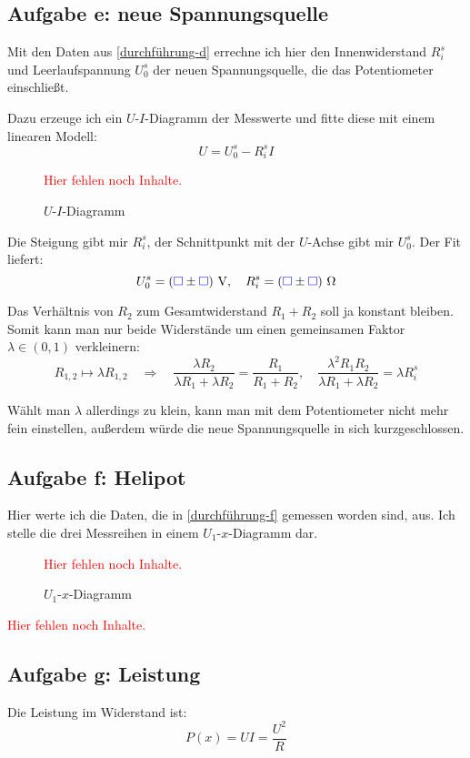 \documentclass[11pt,german]{article}
\newcommand{\messwert}{\textcolor{blue}{\square}}
\newcommand{\emesswert}{\left(\messwert \pm \messwert \right)}
\newcommand{\fehlt}{\textcolor{red}{Hier fehlen noch Inhalte.}}
\begin{document}
\subsection{Aufgabe e: neue Spannungsquelle}

Mit den Daten aus \ref{durchführung-d} errechne ich hier den Innenwiderstand
$R_i^s$ und Leerlaufspannung $U_0^s$ der neuen Spannungsquelle, die das
Potentiometer einschließt.

Dazu erzeuge ich ein $U$-$I$-Diagramm der Messwerte und fitte diese mit einem linearen Modell:
\[ U = U_0^s - R_i^s I \]

\begin{figure}[h!]
	\centering
	\fehlt
	\caption{$U$-$I$-Diagramm}
\end{figure}

Die Steigung gibt mir $R_i^s$, der Schnittpunkt mit der $U$-Achse gibt mir $U_0^s$. Der Fit liefert:
\[
	U_0^s = \unit[\emesswert] V,
	\quad
	R_i^s = \unit[\emesswert] \Omega
\]

Das Verhältnis von $R_2$ zum Gesamtwiderstand $R_1 + R_2$ soll ja konstant
bleiben. Somit kann man nur beide Widerstände um einen gemeinsamen Faktor
$\lambda \in (0, 1)$ verkleinern:
\[
	R_{1,2} \mapsto \lambda R_{1,2}
	\quad \Rightarrow \quad
	\frac{\lambda R_2}{\lambda R_1 + \lambda R_2} = \frac{R_1}{R_1 + R_2},
	\quad
	\frac{\lambda^2 R_1 R_2}{\lambda R_1 + \lambda R_2} = \lambda R_i^s
\]

Wählt man $\lambda$ allerdings zu klein, kann man mit dem Potentiometer nicht
mehr fein einstellen, außerdem würde die neue Spannungsquelle in sich
kurzgeschlossen.

\subsection{Aufgabe f: Helipot}

Hier werte ich die Daten, die in \ref{durchführung-f} gemessen worden sind, aus. Ich stelle die drei Messreihen in einem $U_1$-$x$-Diagramm dar.

\begin{figure}[h!]
	\centering
	\fehlt
	\caption{$U_1$-$x$-Diagramm}
\end{figure}

\fehlt

\subsection{Aufgabe g: Leistung}

Die Leistung im Widerstand ist:
\[ P(x) = U I = \frac{U^2}R \]
\end{document}
